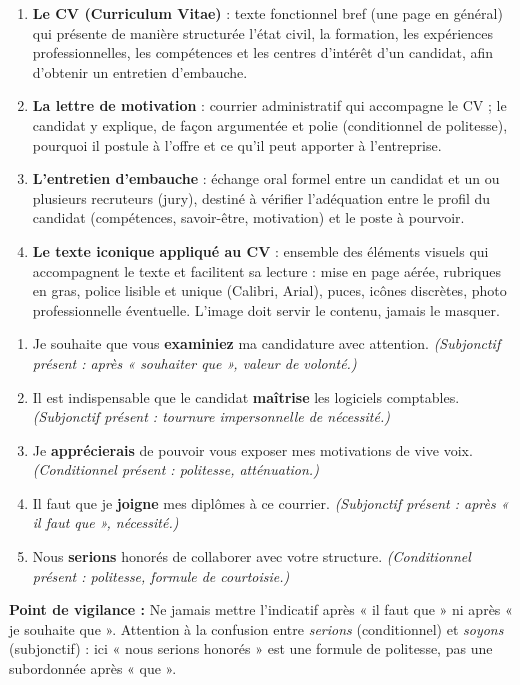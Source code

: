 \documentclass[11pt]{article}
\begin{document}
\begin{corrige}
\begin{enumerate}
\item \textbf{Le CV (Curriculum Vitae)} : texte fonctionnel bref (une page en général) qui présente de manière structurée l'état civil, la formation, les expériences professionnelles, les compétences et les centres d'intérêt d'un candidat, afin d'obtenir un entretien d'embauche.
\item \textbf{La lettre de motivation} : courrier administratif qui accompagne le CV ; le candidat y explique, de façon argumentée et polie (conditionnel de politesse), pourquoi il postule à l'offre et ce qu'il peut apporter à l'entreprise.
\item \textbf{L'entretien d'embauche} : échange oral formel entre un candidat et un ou plusieurs recruteurs (jury), destiné à vérifier l'adéquation entre le profil du candidat (compétences, savoir-être, motivation) et le poste à pourvoir.
\item \textbf{Le texte iconique appliqué au CV} : ensemble des éléments visuels qui accompagnent le texte et facilitent sa lecture : mise en page aérée, rubriques en gras, police lisible et unique (Calibri, Arial), puces, icônes discrètes, photo professionnelle éventuelle. L'image doit servir le contenu, jamais le masquer.
\end{enumerate}
\end{corrige}

\begin{corrige}
\begin{enumerate}
\item Je souhaite que vous \textbf{examiniez} ma candidature avec attention. \textit{(Subjonctif présent : après « souhaiter que », valeur de volonté.)}
\item Il est indispensable que le candidat \textbf{maîtrise} les logiciels comptables. \textit{(Subjonctif présent : tournure impersonnelle de nécessité.)}
\item Je \textbf{apprécierais} de pouvoir vous exposer mes motivations de vive voix. \textit{(Conditionnel présent : politesse, atténuation.)}
\item Il faut que je \textbf{joigne} mes diplômes à ce courrier. \textit{(Subjonctif présent : après « il faut que », nécessité.)}
\item Nous \textbf{serions} honorés de collaborer avec votre structure. \textit{(Conditionnel présent : politesse, formule de courtoisie.)}
\end{enumerate}

\textbf{Point de vigilance :} Ne jamais mettre l'indicatif après « il faut que » ni après « je souhaite que ». Attention à la confusion entre \emph{serions} (conditionnel) et \emph{soyons} (subjonctif) : ici « nous serions honorés » est une formule de politesse, pas une subordonnée après « que ».
\end{corrige}
\end{document}
